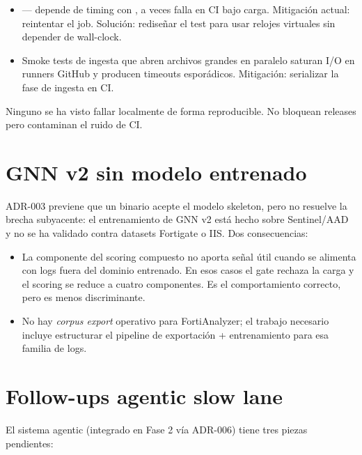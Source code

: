 \begin{itemize}
    \item {} —
    depende de timing con , a veces
    falla en CI bajo carga. Mitigación actual: reintentar el job.
    Solución: rediseñar el test para usar relojes virtuales sin
    depender de wall-clock.
    \item Smoke tests de ingesta que abren archivos grandes en
    paralelo saturan I/O en runners GitHub y producen timeouts
    esporádicos. Mitigación: serializar la fase de ingesta en CI.
\end{itemize}

Ninguno se ha visto fallar localmente de forma reproducible. No
bloquean releases pero contaminan el ruido de CI.

\section{GNN v2 sin modelo entrenado}

ADR-003 previene que un binario acepte el modelo skeleton, pero no
resuelve la brecha subyacente: el entrenamiento de GNN v2 está
hecho sobre Sentinel/AAD y no se ha validado contra datasets
Fortigate o IIS. Dos consecuencias:

\begin{itemize}
    \item La componente  del scoring compuesto no
    aporta señal útil cuando se alimenta con logs fuera del dominio
    entrenado. En esos casos el gate rechaza la carga y el scoring
    se reduce a cuatro componentes. Es el comportamiento correcto,
    pero es menos discriminante.
    \item No hay \emph{corpus export} operativo para
    FortiAnalyzer; el trabajo necesario incluye estructurar el
    pipeline de exportación + entrenamiento para esa familia de
    logs.
\end{itemize}

\section{Follow-ups agentic slow lane}

El sistema agentic (integrado en Fase 2 vía ADR-006) tiene tres
piezas pendientes:

